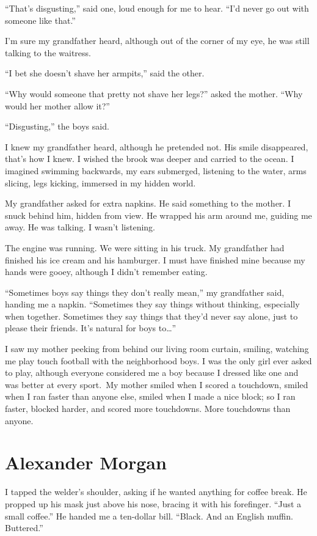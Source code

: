``That's disgusting,'' said one, loud enough for me to hear. ``I'd never
go out with someone like that.''

I'm sure my grandfather heard, although out of the corner of my eye, he
was still talking to the waitress.

``I bet she doesn't shave her armpits,'' said the other.

``Why would someone that pretty not shave her legs?'' asked the mother.
``Why would her mother allow it?''

``Disgusting,'' the boys said. ~

I knew my grandfather heard, although he pretended not. His smile
disappeared, that's how I knew. I wished the brook was deeper and
carried to the ocean. I imagined swimming backwards, my ears submerged,
listening to the water, arms slicing, legs kicking, immersed in my
hidden world.

My grandfather asked for extra napkins. He said something to the mother.
I snuck behind him, hidden from view. He wrapped his arm around me,
guiding me away. He was talking. I wasn't listening.

The engine was running. We were sitting in his truck. My grandfather had
finished his ice cream and his hamburger. I must have finished mine
because my hands were gooey, although I didn't remember eating. ~

``Sometimes boys say things they don't really mean,'' my grandfather
said, handing me a napkin. ``Sometimes they say things without thinking,
especially when together. Sometimes they say things that they'd never
say alone, just to please their friends. It's natural for boys
to\ldots{}''

I saw my mother peeking from behind our living room curtain, smiling,
watching me play touch football with the neighborhood boys. I was the
only girl ever asked to play, although everyone considered me a boy
because I dressed like one and was better at every sport.~My mother
smiled when I scored a touchdown, smiled when I ran faster than anyone
else, smiled when I made a nice block; so I ran faster, blocked harder,
and scored more touchdowns. More touchdowns than anyone.

\chapter{Alexander Morgan}

\titlemark

I tapped the welder's shoulder, asking if he wanted anything for coffee
break. He propped up his mask just above his nose, bracing it with his
forefinger. ``Just a small coffee.'' He handed me a ten-dollar bill.
``Black. And an English muffin. Buttered.''

